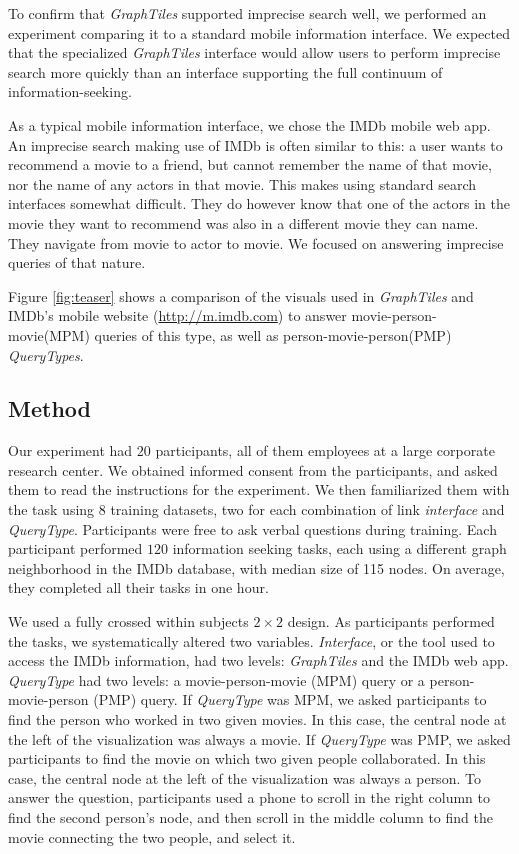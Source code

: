 To confirm that \textit{GraphTiles} supported imprecise search well, we performed an experiment comparing it to a standard mobile information interface. We expected that the specialized \textit{GraphTiles} interface would allow users to perform imprecise search more quickly than an interface supporting the full continuum of information-seeking.

As a typical mobile information interface, we chose the IMDb mobile web app. An imprecise search making use of IMDb is often similar to this: a user wants to recommend a movie to a friend, but cannot remember the name of that movie, nor the name of any actors in that movie. This makes using standard search interfaces somewhat difficult. They do however know that one of the actors in the movie they want to recommend was also in a different movie they can name. They navigate from movie to actor to movie. We focused on answering imprecise queries of that nature. 

Figure \ref{fig:teaser} shows a comparison of the visuals used in \textit{GraphTiles} and IMDb's mobile website (\url{http://m.imdb.com}) to answer movie-person-movie(MPM) queries of this type, as well as person-movie-person(PMP) \textit{QueryTypes}.


\subsection{Method}

Our experiment had $20$ participants, all of them employees at a large corporate research center.  We obtained informed consent from the participants, and asked them to read the instructions for the experiment. We then familiarized them with the task using 8 training datasets, two for each combination of link \textit{interface} and \textit{QueryType}. Participants were free to ask verbal questions during training. Each participant performed $120$ information seeking tasks, each using a different graph neighborhood in the IMDb database, with median size of 115 nodes. On average, they completed all their tasks in one hour.

We used a fully crossed within subjects $2 \times 2$ design. As participants performed the tasks, we systematically altered two variables. \textit{Interface}, or the tool used to access the IMDb information, had two levels: \textit{GraphTiles} and the IMDb web app. \textit{QueryType} had two levels: a movie-person-movie (MPM) query or a person-movie-person (PMP) query. If \textit{QueryType} was MPM, we asked participants to find the person who worked in two given movies. In this case, the central node at the left of the visualization was always a movie. If \textit{QueryType} was PMP, we asked participants to find the movie on which two given people collaborated. In this case, the central node at the left of the visualization was always a person. To answer the question, participants used a phone to scroll in the right column to find the second person's node, and then scroll in the middle column to find the movie connecting the two people, and select it.

